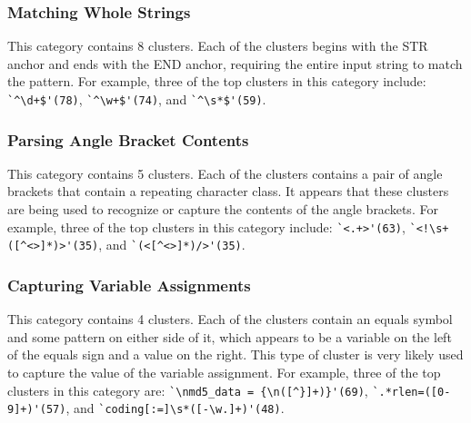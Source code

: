 \subsubsection{ Matching Whole Strings}
This category contains 8 clusters. Each of the clusters begins with the STR anchor and ends with the END anchor, requiring the entire input string to match the pattern. For example, three of the top clusters in this category include:
\verb!`^\d+$'(78)!, \verb!`^\w+$'(74)!, and \verb!`^\s*$'(59)!.


\subsubsection{Parsing Angle Bracket Contents}
This category contains 5 clusters. Each of the clusters contains a pair of angle brackets that contain a repeating character class.  It appears that these clusters are being used to recognize or capture the contents of the angle brackets.  For example, three of the top clusters in this category include:
\verb!`<.+>'(63)!, \verb•`<!\s+([^<>]*)>'(35)•, and \verb!`(<[^<>]*)/>'(35)!. %

\subsubsection{Capturing Variable Assignments}
This category contains 4 clusters. Each of the clusters contain an equals symbol and some pattern on either side of it, which appears to be a variable on the left of the equals sign and a value on the right.  This type of cluster is very likely used to capture the value of the variable assignment. For example, three of the top clusters in this category are:
\verb!`\nmd5_data = {\n([^}]+)}'(69)!, \verb!`.*rlen=([0-9]+)'(57)!, and \verb!`coding[:=]\s*([-\w.]+)'(48)!.


